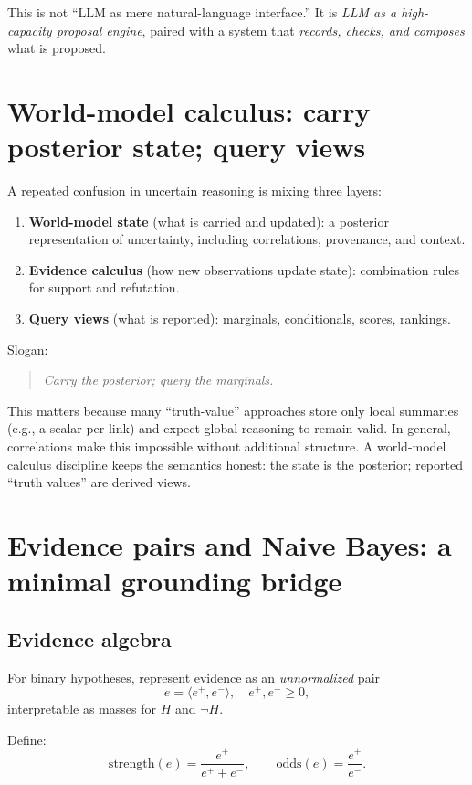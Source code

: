 \documentclass[11pt]{article}
\begin{document}
This is not ``LLM as mere natural-language interface.'' It is \emph{LLM as a high-capacity proposal engine},
paired with a system that \emph{records, checks, and composes} what is proposed.

\section{World-model calculus: carry posterior state; query views}

A repeated confusion in uncertain reasoning is mixing three layers:
\begin{enumerate}[leftmargin=2em]
\item \textbf{World-model state} (what is carried and updated): a posterior representation of uncertainty,
including correlations, provenance, and context.
\item \textbf{Evidence calculus} (how new observations update state): combination rules for support and refutation.
\item \textbf{Query views} (what is reported): marginals, conditionals, scores, rankings.
\end{enumerate}

Slogan:
\begin{quote}
\emph{Carry the posterior; query the marginals.}
\end{quote}

This matters because many ``truth-value'' approaches store only local summaries (e.g., a scalar per link) and
expect global reasoning to remain valid. In general, correlations make this impossible without additional structure.
A world-model calculus discipline keeps the semantics honest: the state is the posterior; reported ``truth values''
are derived views.

\section{Evidence pairs and Naive Bayes: a minimal grounding bridge}

\subsection{Evidence algebra}

For binary hypotheses, represent evidence as an \emph{unnormalized} pair
\[
e = \langle e^+, e^- \rangle,\quad e^+,e^- \ge 0,
\]
interpretable as masses for $H$ and $\neg H$.

Define:
\[
\mathrm{strength}(e) = \frac{e^+}{e^+ + e^-},
\qquad
\mathrm{odds}(e) = \frac{e^+}{e^-}.
\]
\end{document}
